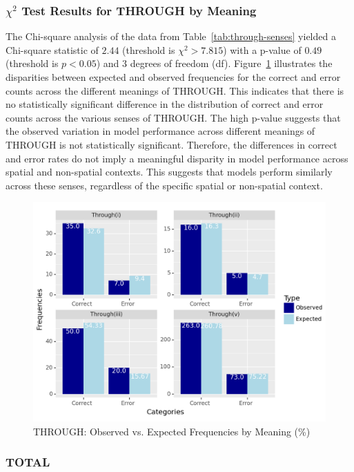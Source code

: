 \subsubsection{$\chi^2$ Test Results for THROUGH by Meaning} 

The Chi-square analysis of the data from Table~\ref{tab:through-senses} yielded a Chi-square statistic of $2.44$ (threshold is $\chi^2 > 7.815$) with a p-value of $0.49$ (threshold is $p < 0.05$) and $3$ degrees of freedom (df). Figure~\ref{fig:through-mean-chi} illustrates the disparities between expected and observed frequencies for the correct and error counts across the different meanings of THROUGH. This indicates that there is no statistically significant difference in the distribution of correct and error counts across the various senses of THROUGH. The high p-value suggests that the observed variation in model performance across different meanings of THROUGH is not statistically significant. Therefore, the differences in correct and error rates do not imply a meaningful disparity in model performance across spatial and non-spatial contexts. This suggests that models perform similarly across these senses, regardless of the specific spatial or non-spatial context.

\begin{figure}[ht]
        \centering
        \includegraphics[width=.8\textwidth]{textual/Figuras/Results/Unknown-79.png}
        \caption{THROUGH: Observed vs. Expected Frequencies by Meaning (\%)}
        \label{fig:through-mean-chi}
\end{figure}

\subsubsection{TOTAL} 

